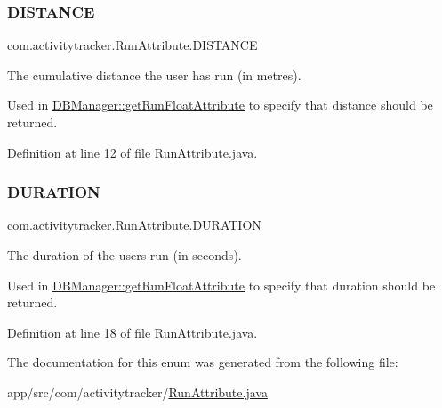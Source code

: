 \subsubsection{\texorpdfstring{D\+I\+S\+T\+A\+N\+CE}{DISTANCE}}
{\footnotesize\ttfamily com.\+activitytracker.\+Run\+Attribute.\+D\+I\+S\+T\+A\+N\+CE}

The cumulative distance the user has run (in metres).

Used in \mbox{\hyperlink{classcom_1_1activitytracker_1_1_d_b_manager_a666452f1e5862f90c06b0beb9a9fcfdd}{D\+B\+Manager\+::get\+Run\+Float\+Attribute}} to specify that distance should be returned. 

Definition at line 12 of file Run\+Attribute.\+java.

\mbox{\label{enumcom_1_1activitytracker_1_1_run_attribute_a7adf133b2a62f1f99ffc2adfb7097ec9}} 
\subsubsection{\texorpdfstring{D\+U\+R\+A\+T\+I\+ON}{DURATION}}
{\footnotesize\ttfamily com.\+activitytracker.\+Run\+Attribute.\+D\+U\+R\+A\+T\+I\+ON}

The duration of the user\textquotesingle{}s run (in seconds).

Used in \mbox{\hyperlink{classcom_1_1activitytracker_1_1_d_b_manager_a666452f1e5862f90c06b0beb9a9fcfdd}{D\+B\+Manager\+::get\+Run\+Float\+Attribute}} to specify that duration should be returned. 

Definition at line 18 of file Run\+Attribute.\+java.



The documentation for this enum was generated from the following file\+:\begin{DoxyCompactItemize}
\item 
app/src/com/activitytracker/\mbox{\hyperlink{_run_attribute_8java}{Run\+Attribute.\+java}}\end{DoxyCompactItemize}
